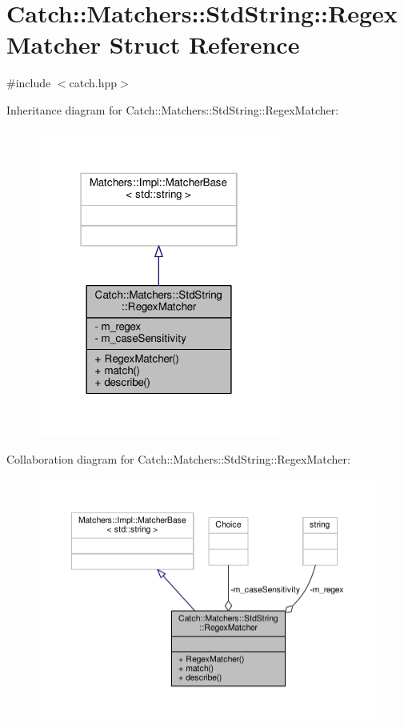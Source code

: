 \hypertarget{struct_catch_1_1_matchers_1_1_std_string_1_1_regex_matcher}{\section{Catch\-:\-:Matchers\-:\-:Std\-String\-:\-:Regex\-Matcher Struct Reference}
\label{struct_catch_1_1_matchers_1_1_std_string_1_1_regex_matcher}
}


{\ttfamily \#include $<$catch.\-hpp$>$}



Inheritance diagram for Catch\-:\-:Matchers\-:\-:Std\-String\-:\-:Regex\-Matcher\-:
\nopagebreak
\begin{figure}[H]
\begin{center}
\leavevmode
\includegraphics[width=226pt]{struct_catch_1_1_matchers_1_1_std_string_1_1_regex_matcher__inherit__graph}
\end{center}
\end{figure}


Collaboration diagram for Catch\-:\-:Matchers\-:\-:Std\-String\-:\-:Regex\-Matcher\-:
\nopagebreak
\begin{figure}[H]
\begin{center}
\leavevmode
\includegraphics[width=350pt]{struct_catch_1_1_matchers_1_1_std_string_1_1_regex_matcher__coll__graph}
\end{center}
\end{figure}
